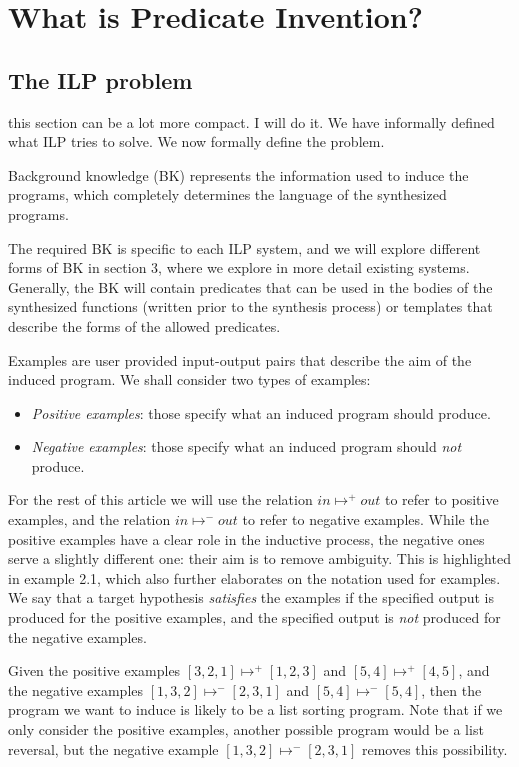 \section{What is Predicate Invention?}
\subsection{The ILP problem}
\ac{this section can be a lot more compact. I will do it.}
We have informally defined what ILP tries to solve. We now formally define the problem.

\begin{defn}
Background knowledge (BK) represents the information used to induce the programs,  which completely determines the language of the synthesized programs.
\end{defn}
The required BK is specific to each ILP system, and we will explore different forms of BK in section 3, where we explore in more detail existing systems. Generally, the BK will contain predicates that can be used in the bodies of the synthesized functions (written prior to the synthesis process) or templates that describe the forms of the allowed predicates.

\begin{defn}[Examples]
Examples are user provided input-output pairs that describe the aim of the induced program. We shall consider two types of examples:
\begin{itemize}
\item \textit{Positive examples}: those specify what an induced program should produce.
\item \textit{Negative examples}: those specify what an induced program should \emph{not} produce.
\end{itemize}
\end{defn}
For the rest of this article we will use the relation $in \mapsto^+ out$ to refer to positive examples, and the relation $in \mapsto^- out$ to refer to negative examples. While the positive examples have a clear role in the inductive process, the negative ones serve a slightly different one: their aim is to remove ambiguity. This is highlighted in example 2.1, which also further elaborates on the notation used for examples. We say that a target hypothesis \emph{satisfies} the examples if the specified output is produced for the positive examples, and the specified output is \emph{not} produced for the negative examples.

\begin{example}[Examples]
Given the positive examples $[3,2,1] \mapsto^+ [1,2,3]$ and $[5,4] \mapsto^+ [4,5]$, and the negative examples $[1,3,2] \mapsto^- [2,3,1]$ and $[5,4] \mapsto^- [5,4]$, then the program we want to induce is likely to be a list sorting program. Note that if we only consider the positive examples, another possible program would be a list reversal, but the negative example $[1,3,2] \mapsto^- [2,3,1]$ removes this possibility.
\end{example}

